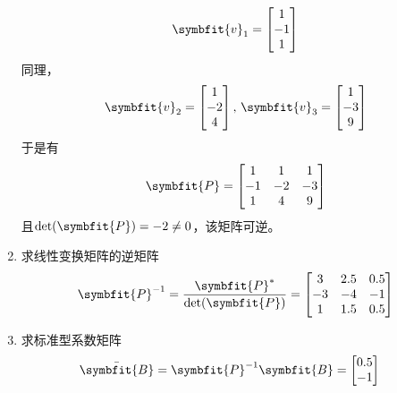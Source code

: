 \begin{exercise}
\begin{enumerate}
\begin{equation*}
            \symbfit{v}_1 = \begin{bmatrix}
                1 \\
                -1 \\
                1
            \end{bmatrix}
        \end{equation*}
        同理，
        \begin{equation*}
            \symbfit{v}_2 = \begin{bmatrix}
                1 \\
                -2 \\
                4
            \end{bmatrix},\,\symbfit{v}_3 = \begin{bmatrix}
                1 \\
                -3 \\
                9
            \end{bmatrix}
        \end{equation*}
        于是有
        \begin{equation*}
            \symbfit{P} = \begin{bmatrix}
                1  & 1  & 1 \\
                -1 & -2 & -3 \\
                1  & 4  & 9 \\
            \end{bmatrix}
        \end{equation*}
        且$\det(\symbfit{P}) = -2 \neq 0$，该矩阵可逆。
        \item 求线性变换矩阵的逆矩阵
        \begin{equation*}
            \symbfit{P}^{-1} = \frac{\symbfit{P}^*}{\det(\symbfit{P})} = \begin{bmatrix}
                3 & 2.5 & 0.5 \\
                -3 & -4 & -1 \\
                1 & 1.5 & 0.5 \\
            \end{bmatrix}
        \end{equation*}
        \item 求标准型系数矩阵
        \begin{align*}
            &\bar{\symbfit{B}} = \symbfit{P}^{-1}\symbfit{B} = \begin{bmatrix}
                0.5 \\
                -1 \\

\end{bmatrix}
\end{align*}
\end{enumerate}
\end{exercise}
